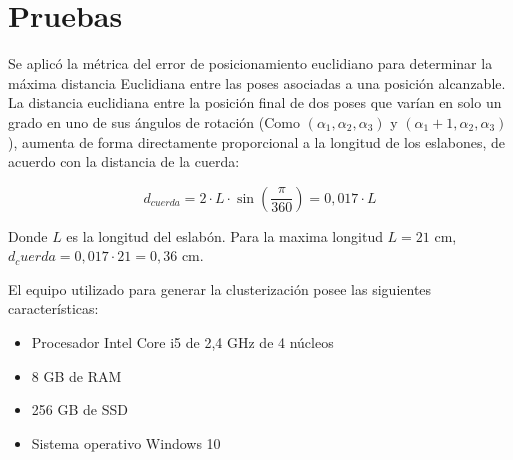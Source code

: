 \section{Pruebas}

Se aplicó la métrica del error de posicionamiento euclidiano para determinar la máxima distancia Euclidiana entre las poses asociadas a una posición alcanzable. La distancia euclidiana entre la posición final de dos poses que varían en solo un grado en uno de sus ángulos de rotación (Como $(\alpha_1,\alpha_2,\alpha_3)$ y $(\alpha_1 + 1, \alpha_2, \alpha_3)$), aumenta de forma directamente proporcional a la longitud de los eslabones, de acuerdo con la distancia de la cuerda:

\begin{equation}
	d_{cuerda} = 2 \cdot L \cdot \sin(\frac{\pi}{360}) = 0,017 \cdot L
\end{equation}

Donde $L$ es la longitud del eslabón. Para la maxima longitud $L = 21$ cm, $d_cuerda = 0,017 \cdot 21 = 0,36$ cm.

El equipo utilizado para generar la clusterización posee las siguientes características:

\begin{itemize}
	\item Procesador Intel Core i5 de 2,4 GHz de 4 núcleos
	\item 8 GB de RAM
	\item 256 GB de SSD
	\item Sistema operativo Windows 10
\end{itemize}

